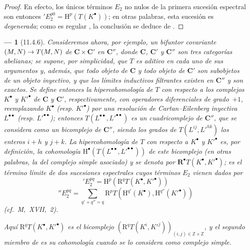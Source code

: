 \documentclass[10pt,oneside,openany]{book}
\theoremstyle{egaenv}\newtheorem*{env}{---}
\theoremstyle{egastatement}
\theoremstyle{egadescription}
\newcommand{\oldpage}[2][]{\marginnote{\normalfont\scriptsize\textbf{#1}\,|\,#2}\ignorespaces}
\renewcommand{\to}{\mathchoice{\longrightarrow}{\rightarrow}{\rightarrow}{\rightarrow}}
\begin{document}
\begin{proof}
En efecto, los únicos términos $E_2$ no nulos de la primera sucesión espectral  son entonces $'E_2^{p0}=\mathrm H^p(T(K^\bullet))$;
en otras palabras, esta sucesión es \emph{degenerada};
como es regular , la conclusión se deduce de .
\end{proof}

\begin{env}[11.4.6]
\label{0.11.4.6}
\label{0.11.4.6-fr}
Consideremos ahora, por ejemplo, un \emph{bifuntor} covariante $(M,N)\to T(M,N)$ de $\boldsymbol{C}\times\boldsymbol{C}'$ en $\boldsymbol{C}''$, donde $\boldsymbol{C}$, $\boldsymbol{C}'$ y $\boldsymbol{C}''$ son tres categorías abelianas;
se supone, por simplicidad, que $T$ es aditivo en cada uno de sus argumentos y, además, que todo objeto de $\boldsymbol{C}$ y todo objeto de $\boldsymbol{C}'$ son subobjetos de un objeto inyectivo,
y que los límites inductivos filtrantes existen en $\boldsymbol{C}''$ y son exactos.
Se define entonces la \emph{hipercohomología} de $T$ con respecto a los complejos $K^\bullet$ y $K'^\bullet$ de $\boldsymbol{C}$ y $\boldsymbol{C}'$, respectivamente, con operadores diferenciales de grado~$+1$, reemplazando $K^\bullet$ (resp. $K'^\bullet$) por una resolución de Cartan--Eilenberg inyectiva $L^{\bullet\bullet}$ (resp. $L'^{\bullet\bullet}$);
entonces $T(L^{\bullet\bullet},L'^{\bullet\bullet})$ es un cuadricomplejo de $\boldsymbol{C}''$, que se considera como un \emph{bicomplejo} de $\boldsymbol{C}''$, siendo los grados de $T(L^{ij},L'^{hk})$ los enteros $i+h$ y $j+k$.
La \emph{hipercohomología} de $T$ con respecto a $K^\bullet$ y $K'^\bullet$ es, por definición, la cohomología $\mathrm H^\bullet(T(L^{\bullet\bullet},L'^{\bullet\bullet}))$ de este bicomplejo (en otras palabras, la del complejo simple asociado) y se denota por $\mathbf R^\bullet T(K^\bullet,K'^\bullet)$;
\oldpage[0\textsubscript{III}]{35}
es el término límite de dos sucesiones espectrales cuyos términos $E_2$ vienen dados por
\[
  \label{0.11.4.6.1-fr}
  'E_2^{pq}=\mathrm H^p(\mathrm R^qT(K^\bullet,K'^\bullet))
  \tag{11.4.6.1}
\]
\[
  \label{0.11.4.6.2-fr}
  ''E_2^{pq}=\sum_{q'+q''=q}
  \mathrm R^pT(\mathrm H^{q'}(K^\bullet),\mathrm H^{q''}(K'^\bullet))
  \tag{11.4.6.2}
\]
(cf.~M,~XVII,~2).

Aquí $\mathrm R^qT(K^\bullet,K'^\bullet)$ es el bicomplejo $(\mathrm R^qT(K^i,K'^j))_{(i,j)\in\mathbb Z\times\mathbb Z}$, y el segundo miembro de  es su cohomología cuando se lo considera como complejo simple.


\end{env}
\end{document}
